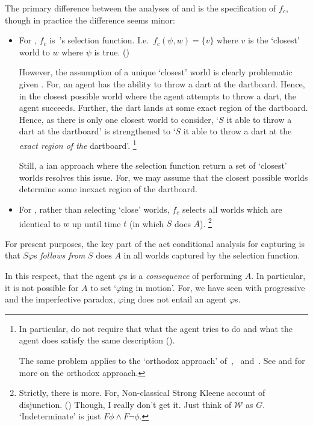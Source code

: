 \begin{note}
  The primary difference between the analyses of \citeauthor{Mandelkern:2017aa} and \citeauthor{Boylan:2020aa} is the specification of \(f_{c}\), though in practice the difference seems minor:
  \begin{itemize}
  \item
    For \citeauthor{Mandelkern:2017aa},
    \(f_{c}\) is~\citeauthor{Stalnaker:1968vt}'s selection function.
    I.e.\ \(f_{c}(\psi, w) = \{v\}\) where \(v\) is the `closest' world to \(w\) where \(\psi\) is true.
    (\citeyear[Cf.][314]{Mandelkern:2017aa})

    However, the assumption of a unique `closest' world is clearly problematic given \BoyVS{}.
    For, an agent has the ability to throw a dart at the dartboard.
    Hence, in the closest possible world where the agent attempts to throw a dart, the agent succeeds.
    Further, the dart lands at some exact region of the dartboard.
    Hence, as there is only one closest world to consider, `\(S\) it able to throw a dart at the dartboard' is strengthened to `\(S\) it able to throw a dart at the \emph{exact region of the} dartboard'.%
    \footnote{
      In particular, \citeauthor{Mandelkern:2017aa} do not require that what the agent tries to do and what the agent does satisfy the same description (\citeyear[310,314]{Mandelkern:2017aa}).

      The same problem applies to the `orthodox approach' of~\textcite{Hilpinen:1969vw}, \textcite{Kratzer:1977aa,Kratzer:1981vn}~and~\textcite{Lewis:1976us}.
      See \textcite[\S1.3]{Boylan:2020aa} and \textcite[\S2]{Mandelkern:2017aa} for more on the orthodox approach.
    }

    Still, a \citeauthor{Lewis:1973th}ian approach where the selection function return a set of `closest' worlds resolves this issue.
    For, we may assume that the closest possible worlds determine some inexact region of the dartboard.
  \item
    For \citeauthor{Boylan:2020aa}, rather than selecting `close' worlds, \(f_{c}\) selects all worlds which are identical to \(w\) up until time \(t\) (in which \(S\) does \(A\)).%
    \footnote{
      Strictly, there is more.
      For, Non-classical Strong Kleene account of disjunction.
      (\citeyear[\S5]{Boylan:2020aa})
      Though, I really don't get it.
      Just think of \(\mathcal{W}\) as \(G\).
      `Indeterminate' is just \(F \phi \land F \lnot \phi\).
    }
  \end{itemize}
  For present purposes, the key part of the act conditional analysis for capturing \AbControl{} is that \(S \varphi\)s \emph{follows from} \(S\text{ does }A\) in all worlds captured by the selection function.

  In this respect, that the agent \(\varphi\)s is a \emph{consequence} of performing \(A\).
  In particular, it is not possible for \(A\) to set `\(\varphi\)ing in motion'.
  For, we have seen with progressive and the imperfective paradox, \(\varphi\)ing does not entail an agent \(\varphi\)s.
\end{note}

